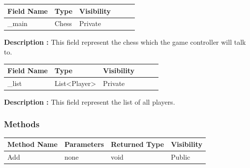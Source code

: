 \documentclass[12pt]{article}
\begin{document}
    \begin{table}[H]
        \begin{tabular}{llllll}
            \hline
            \multicolumn{1}{|l|}{\cellcolor[HTML]{EFEFEF}\textbf{Field Name}} & \multicolumn{1}{l|}{\cellcolor[HTML]{EFEFEF}\textbf{Type}} & \multicolumn{1}{l|}{\cellcolor[HTML]{EFEFEF}\textbf{Visibility}} \\ \hline
            \multicolumn{1}{|l|}{\_main}                                      & \multicolumn{1}{l|}{Chess}                                 & \multicolumn{1}{l|}{Private}                                     \\ \hline
        \end{tabular}
    \end{table}

    \textbf{Description :} This field represent the chess which the game controller will talk to.

    \begin{table}[H]
        \begin{tabular}{llllll}
            \hline
            \multicolumn{1}{|l|}{\cellcolor[HTML]{EFEFEF}\textbf{Field Name}} & \multicolumn{1}{l|}{\cellcolor[HTML]{EFEFEF}\textbf{Type}} & \multicolumn{1}{l|}{\cellcolor[HTML]{EFEFEF}\textbf{Visibility}} \\ \hline
            \multicolumn{1}{|l|}{\_list}                                      & \multicolumn{1}{l|}{List\textless{}Player\textgreater{}}                                 & \multicolumn{1}{l|}{Private}                                     \\ \hline
        \end{tabular}
    \end{table}

    \textbf{Description :} This field represent the list of all players.

    \subsubsection{Methods}

    \begin{table}[H]
        \begin{tabular}{|l|l|l|l|}
            \hline
            \rowcolor[HTML]{EFEFEF}
            \cellcolor[HTML]{EFEFEF}\textbf{Method Name} & \textbf{Parameters} & \textbf{Returned Type} & \textbf{Visibility} \\ \hline
            Add                                          & none                & void                   & Public              \\ \hline
        \end{tabular}
    \end{table}
\end{document}
